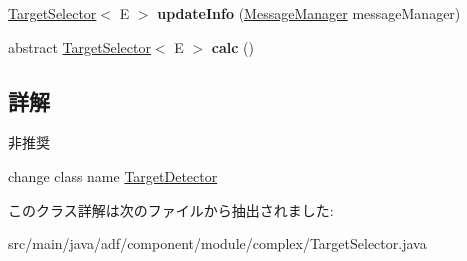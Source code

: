 \begin{DoxyCompactItemize}
\hypertarget{classadf_1_1component_1_1module_1_1complex_1_1TargetSelector_a91278e0b3b662efd8617e96309248942}{}\label{classadf_1_1component_1_1module_1_1complex_1_1TargetSelector_a91278e0b3b662efd8617e96309248942} 
\hyperlink{classadf_1_1component_1_1module_1_1complex_1_1TargetSelector}{Target\+Selector}$<$ E $>$ {\bfseries update\+Info} (\hyperlink{classadf_1_1agent_1_1communication_1_1MessageManager}{Message\+Manager} message\+Manager)
\item 
\hypertarget{classadf_1_1component_1_1module_1_1complex_1_1TargetSelector_a1e776672858945c16604c7e7e2e8eafe}{}\label{classadf_1_1component_1_1module_1_1complex_1_1TargetSelector_a1e776672858945c16604c7e7e2e8eafe} 
abstract \hyperlink{classadf_1_1component_1_1module_1_1complex_1_1TargetSelector}{Target\+Selector}$<$ E $>$ {\bfseries calc} ()
\end{DoxyCompactItemize}


\subsection{詳解}
\begin{DoxyRefDesc}{非推奨}
\item[\hyperlink{deprecated__deprecated000016}{非推奨}]change class name \hyperlink{classadf_1_1component_1_1module_1_1complex_1_1TargetDetector}{Target\+Detector} \end{DoxyRefDesc}


このクラス詳解は次のファイルから抽出されました\+:\begin{DoxyCompactItemize}
\item 
src/main/java/adf/component/module/complex/Target\+Selector.\+java\end{DoxyCompactItemize}

